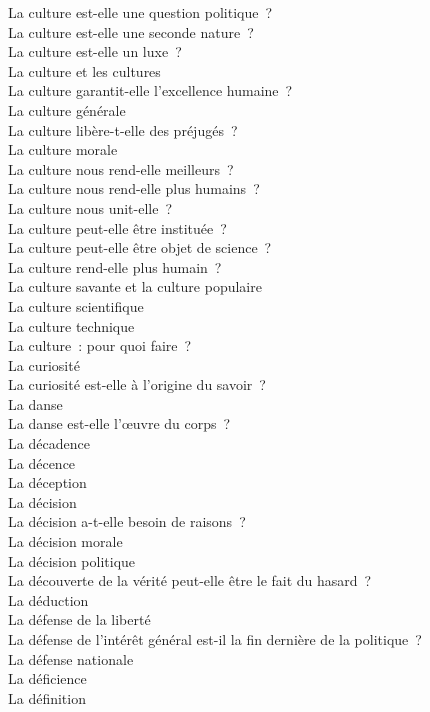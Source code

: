 \documentclass[a4paper,12pt]{article}
\begin{document}
La culture est-elle une question politique ? \\
La culture est-elle une seconde nature ? \\
La culture est-elle un luxe ? \\
La culture et les cultures \\
La culture garantit-elle l'excellence humaine ? \\
La culture générale \\
La culture libère-t-elle des préjugés ? \\
La culture morale \\
La culture nous rend-elle meilleurs ? \\
La culture nous rend-elle plus humains ? \\
La culture nous unit-elle ? \\
La culture peut-elle être instituée ? \\
La culture peut-elle être objet de science ? \\
La culture rend-elle plus humain ? \\
La culture savante et la culture populaire \\
La culture scientifique \\
La culture technique \\
La culture : pour quoi faire ? \\
La curiosité \\
La curiosité est-elle à l'origine du savoir ? \\
La danse \\
La danse est-elle l'œuvre du corps ? \\
La décadence \\
La décence \\
La déception \\
La décision \\
La décision a-t-elle besoin de raisons ? \\
La décision morale \\
La décision politique \\
La découverte de la vérité peut-elle être le fait du hasard ? \\
La déduction \\
La défense de la liberté \\
La défense de l'intérêt général est-il la fin dernière de la politique ? \\
La défense nationale \\
La déficience \\
La définition \\
\end{document}
